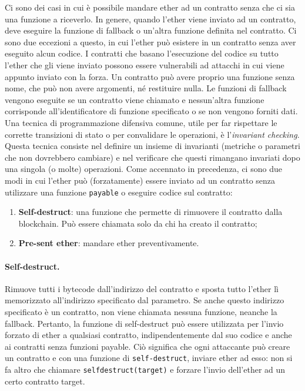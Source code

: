 Ci sono dei casi in cui è possibile mandare ether ad un contratto senza che ci
sia una funzione a riceverlo.
In genere, quando l'ether viene inviato ad un contratto, deve eseguire la
funzione di fallback o un'altra funzione definita nel contratto.
Ci sono due eccezioni a questo, in cui l'ether può
esistere in un contratto senza aver eseguito alcun codice.
I contratti che basano l'esecuzione
del codice su tutto l'ether che gli viene inviato possono essere vulnerabili ad
attacchi in cui
viene appunto inviato con la forza.
Un contratto può avere proprio una funzione senza nome,
che può non avere argomenti, né
restituire nulla. Le funzioni di fallback vengono eseguite se un contratto viene
chiamato e
nessun'altra funzione corrisponde all'identificatore di funzione specificato
o se non vengono forniti dati.
Una tecnica di programmazione difensiva comune, utile per far rispettare le
corrette transizioni di stato o per convalidare le operazioni, è
l'\textit{invariant checking}. Questa tecnica
consiste nel definire un insieme di invarianti
(metriche o parametri che non dovrebbero
cambiare) e nel verificare che questi rimangano invariati dopo una singola (o molte)
operazioni.
Come accennato in precedenza, ci sono due modi in cui l'ether può (forzatamente)
essere
inviato ad un contratto senza utilizzare una funzione \verb|payable| o eseguire
codice sul contratto:

\begin{enumerate}
      \item \textbf{Self-destruct}: una funzione che permette di rimuovere il
            contratto dalla blockchain.
            Può essere chiamata solo da chi ha creato il contratto;
      \item \textbf{Pre-sent ether}: mandare ether preventivamente.
\end{enumerate}

\paragraph{Self-destruct.}

Rimuove tutti i bytecode dall'indirizzo del contratto e sposta tutto l'ether
lì memorizzato all'indirizzo specificato dal parametro. Se anche questo
indirizzo specificato è un contratto,
non viene chiamata nessuna funzione, neanche la fallback. Pertanto, la funzione di
self-destruct può essere utilizzata per l'invio forzato di ether a qualsiasi
contratto,
indipendentemente dal suo codice e anche ai contratti senza funzioni payable.
Ciò significa che ogni attaccante può creare un contratto e con una funzione di
\verb|self-destruct|,
inviare ether ad esso: non si fa altro che chiamare \verb|selfdestruct(target)|
e forzare
l'invio dell'ether ad un certo contratto target.

